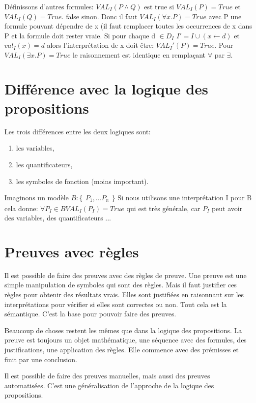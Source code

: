 Définissons d'autres formules: $VAL_{I}(P \wedge Q) $ est true si $VAL_{I}(P) = True$ et $VAL_{I}(Q) = True$. false sinon. Donc il faut $VAL_{I}(\forall x.P) = True$ avec P une formule pouvant dépendre de x (il faut remplacer toutes les occurrences de x dans P et la formule doit rester vraie. Si pour chaque d $\in D_{I}$ $ I' = I \cup (x \leftarrow d)$ et $val_{I}(x) = d$ alors l'interprétation de x doit être: $VAL_{I}'(P) = True$.
Pour $VAL_{I}(\exists x.P) = True$ le raisonnement est identique en remplaçant $\forall$ par $\exists$.
\section{Différence avec la logique des propositions}
Les trois différences entre les deux logiques sont:
\begin{enumerate}
\item les variables,
\item les quantificateurs,
\item les symboles de fonction (moins important).
\end{enumerate}  
Imaginons un modèle $B:
\{
  \begin{array}{rcr}
    P_{1},...P_{n}
  \end{array}
\}
$
Si nous utilisons une interprétation I pour B cela donne:
$\forall P_{I} \in B VAL_{I}(P_{I}) = True$ qui est très générale, car $P_{I}$ peut avoir des variables, des quantificateurs ...


\section{Preuves avec règles}

    Il est possible de faire des preuves avec des règles de preuve. Une preuve est une simple manipulation de symboles qui sont des règles. Mais il faut justifier ces règles pour obtenir des résultats vrais. Elles sont justifiées en raisonnant sur les interprétations pour vérifier si elles sont correctes ou non. Tout cela est la sémantique. C'est la base pour pouvoir faire des preuves.

    
Beaucoup de choses restent les mêmes que dans la logique des propositions. La preuve est toujours un objet mathématique, une séquence avec des formules, des justifications, une application des règles. Elle commence avec des prémisses et finit par une conclusion.


Il est possible de faire des preuves manuelles, mais aussi des preuves automatisées. C'est une généralisation de l'approche de la logique des propositions. 


